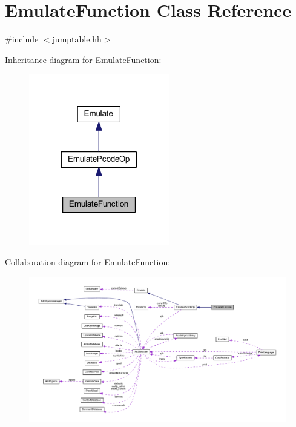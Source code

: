 \hypertarget{class_emulate_function}{}\section{Emulate\+Function Class Reference}
\label{class_emulate_function}


{\ttfamily \#include $<$jumptable.\+hh$>$}



Inheritance diagram for Emulate\+Function\+:
\nopagebreak
\begin{figure}[H]
\begin{center}
\leavevmode
\includegraphics[width=173pt]{class_emulate_function__inherit__graph}
\end{center}
\end{figure}


Collaboration diagram for Emulate\+Function\+:
\nopagebreak
\begin{figure}[H]
\begin{center}
\leavevmode
\includegraphics[width=350pt]{class_emulate_function__coll__graph}
\end{center}
\end{figure}
